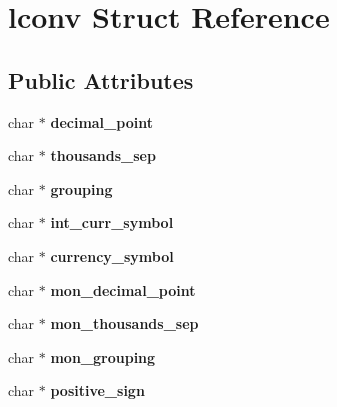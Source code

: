 \hypertarget{structlconv}{\section{lconv Struct Reference}
\label{structlconv}
}
\subsection*{Public Attributes}
\begin{DoxyCompactItemize}
\item 
\hypertarget{structlconv_a53249107894ce62b7672a1292c4570b2}{char $\ast$ {\bfseries decimal\+\_\+point}}\label{structlconv_a53249107894ce62b7672a1292c4570b2}

\item 
\hypertarget{structlconv_af413c64c729248eec8e703e87da85ccf}{char $\ast$ {\bfseries thousands\+\_\+sep}}\label{structlconv_af413c64c729248eec8e703e87da85ccf}

\item 
\hypertarget{structlconv_a556252cfa5d5df419a141e9dbd923f32}{char $\ast$ {\bfseries grouping}}\label{structlconv_a556252cfa5d5df419a141e9dbd923f32}

\item 
\hypertarget{structlconv_a31aad371909936726e90e3beb6976f8b}{char $\ast$ {\bfseries int\+\_\+curr\+\_\+symbol}}\label{structlconv_a31aad371909936726e90e3beb6976f8b}

\item 
\hypertarget{structlconv_aeddc713a2442ef08ee2a9bca95b628ee}{char $\ast$ {\bfseries currency\+\_\+symbol}}\label{structlconv_aeddc713a2442ef08ee2a9bca95b628ee}

\item 
\hypertarget{structlconv_ad80c4b57b567e26304870eee77c04e7c}{char $\ast$ {\bfseries mon\+\_\+decimal\+\_\+point}}\label{structlconv_ad80c4b57b567e26304870eee77c04e7c}

\item 
\hypertarget{structlconv_a0b901cc6fa8dbbff49803e9321e84420}{char $\ast$ {\bfseries mon\+\_\+thousands\+\_\+sep}}\label{structlconv_a0b901cc6fa8dbbff49803e9321e84420}

\item 
\hypertarget{structlconv_aba702bec49ef1c3e30dcc8dce18a666f}{char $\ast$ {\bfseries mon\+\_\+grouping}}\label{structlconv_aba702bec49ef1c3e30dcc8dce18a666f}

\item 
\hypertarget{structlconv_a41a0c892b5385259eeacdb57b6705774}{char $\ast$ {\bfseries positive\+\_\+sign}}\label{structlconv_a41a0c892b5385259eeacdb57b6705774}


\end{DoxyCompactItemize}
